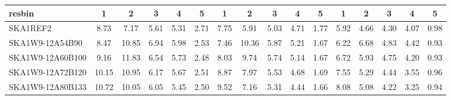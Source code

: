 \begin{table}[H]
{{\begin{tabular}{|lccccc||ccccc||ccccc|}
 resbin  &1 & 2 & 3 & 4 & 5 & 1 & 2 & 3 & 4 & 5 & 1 & 2 & 3 & 4 & 5 \\ \hline
SKA1REF2 & 8.73 \cellcolor{blue!22.85} & 7.17 \cellcolor{red!18.00} & 5.61 \cellcolor{green!18.00} & 5.31 \cellcolor{orange!18.00} & 2.71 \cellcolor{purple!60.00} & 7.75 \cellcolor{blue!23.91} & 5.91 \cellcolor{red!18.00} & 5.03 \cellcolor{green!18.00} & 4.71 \cellcolor{orange!32.73} & 1.77 \cellcolor{purple!60.00} & 5.92 \cellcolor{blue!18.00} & 4.66 \cellcolor{red!18.00} & 4.30 \cellcolor{green!23.51} & 4.07 \cellcolor{orange!47.44} & 0.98 \cellcolor{purple!60.00}\\ \hline 
SKA1W9-12A54B90 & 8.47 \cellcolor{blue!18.00} & 10.85 \cellcolor{red!51.17} & 6.94 \cellcolor{green!60.00} & 5.98 \cellcolor{orange!60.00} & 2.53 \cellcolor{purple!27.13} & 7.46 \cellcolor{blue!18.00} & 10.36 \cellcolor{red!60.00} & 5.87 \cellcolor{green!60.00} & 5.21 \cellcolor{orange!60.00} & 1.67 \cellcolor{purple!21.82} & 6.22 \cellcolor{blue!23.83} & 6.68 \cellcolor{red!60.00} & 4.83 \cellcolor{green!60.00} & 4.42 \cellcolor{orange!60.00} & 0.93 \cellcolor{purple!18.00}\\ \hline 
SKA1W9-12A60B100 & 9.16 \cellcolor{blue!30.88} & 11.83 \cellcolor{red!60.00} & 6.54 \cellcolor{green!47.37} & 5.73 \cellcolor{orange!44.33} & 2.48 \cellcolor{purple!18.00} & 8.03 \cellcolor{blue!29.62} & 9.74 \cellcolor{red!54.15} & 5.74 \cellcolor{green!53.50} & 5.14 \cellcolor{orange!56.18} & 1.67 \cellcolor{purple!21.82} & 6.72 \cellcolor{blue!33.56} & 5.93 \cellcolor{red!44.41} & 4.75 \cellcolor{green!54.49} & 4.20 \cellcolor{orange!52.10} & 0.93 \cellcolor{purple!18.00}\\ \hline 
SKA1W9-12A72B120 & 10.15 \cellcolor{blue!49.36} & 10.95 \cellcolor{red!52.07} & 6.17 \cellcolor{green!35.68} & 5.67 \cellcolor{orange!40.57} & 2.51 \cellcolor{purple!23.48} & 8.87 \cellcolor{blue!46.75} & 7.97 \cellcolor{red!37.44} & 5.53 \cellcolor{green!43.00} & 4.68 \cellcolor{orange!31.09} & 1.69 \cellcolor{purple!29.45} & 7.55 \cellcolor{blue!49.69} & 5.29 \cellcolor{red!31.10} & 4.44 \cellcolor{green!33.15} & 3.55 \cellcolor{orange!28.77} & 0.96 \cellcolor{purple!43.20}\\ \hline 
SKA1W9-12A80B133 & 10.72 \cellcolor{blue!60.00} & 10.05 \cellcolor{red!43.96} & 6.05 \cellcolor{green!31.89} & 5.45 \cellcolor{orange!26.78} & 2.50 \cellcolor{purple!21.65} & 9.52 \cellcolor{blue!60.00} & 7.16 \cellcolor{red!29.80} & 5.31 \cellcolor{green!32.00} & 4.44 \cellcolor{orange!18.00} & 1.66 \cellcolor{purple!18.00} & 8.08 \cellcolor{blue!60.00} & 5.08 \cellcolor{red!26.73} & 4.22 \cellcolor{green!18.00} & 3.25 \cellcolor{orange!18.00} & 0.94 \cellcolor{purple!26.40}\\ \hline 

\end{tabular}}}
\end{table}
